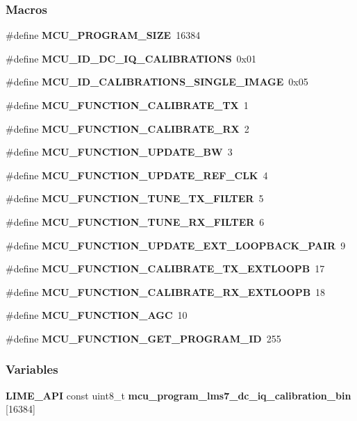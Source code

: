 \subsubsection*{Macros}
\begin{DoxyCompactItemize}
\item 
\#define {\bf M\+C\+U\+\_\+\+P\+R\+O\+G\+R\+A\+M\+\_\+\+S\+I\+ZE}~16384
\item 
\#define {\bf M\+C\+U\+\_\+\+I\+D\+\_\+\+D\+C\+\_\+\+I\+Q\+\_\+\+C\+A\+L\+I\+B\+R\+A\+T\+I\+O\+NS}~0x01
\item 
\#define {\bf M\+C\+U\+\_\+\+I\+D\+\_\+\+C\+A\+L\+I\+B\+R\+A\+T\+I\+O\+N\+S\+\_\+\+S\+I\+N\+G\+L\+E\+\_\+\+I\+M\+A\+GE}~0x05
\item 
\#define {\bf M\+C\+U\+\_\+\+F\+U\+N\+C\+T\+I\+O\+N\+\_\+\+C\+A\+L\+I\+B\+R\+A\+T\+E\+\_\+\+TX}~1
\item 
\#define {\bf M\+C\+U\+\_\+\+F\+U\+N\+C\+T\+I\+O\+N\+\_\+\+C\+A\+L\+I\+B\+R\+A\+T\+E\+\_\+\+RX}~2
\item 
\#define {\bf M\+C\+U\+\_\+\+F\+U\+N\+C\+T\+I\+O\+N\+\_\+\+U\+P\+D\+A\+T\+E\+\_\+\+BW}~3
\item 
\#define {\bf M\+C\+U\+\_\+\+F\+U\+N\+C\+T\+I\+O\+N\+\_\+\+U\+P\+D\+A\+T\+E\+\_\+\+R\+E\+F\+\_\+\+C\+LK}~4
\item 
\#define {\bf M\+C\+U\+\_\+\+F\+U\+N\+C\+T\+I\+O\+N\+\_\+\+T\+U\+N\+E\+\_\+\+T\+X\+\_\+\+F\+I\+L\+T\+ER}~5
\item 
\#define {\bf M\+C\+U\+\_\+\+F\+U\+N\+C\+T\+I\+O\+N\+\_\+\+T\+U\+N\+E\+\_\+\+R\+X\+\_\+\+F\+I\+L\+T\+ER}~6
\item 
\#define {\bf M\+C\+U\+\_\+\+F\+U\+N\+C\+T\+I\+O\+N\+\_\+\+U\+P\+D\+A\+T\+E\+\_\+\+E\+X\+T\+\_\+\+L\+O\+O\+P\+B\+A\+C\+K\+\_\+\+P\+A\+IR}~9
\item 
\#define {\bf M\+C\+U\+\_\+\+F\+U\+N\+C\+T\+I\+O\+N\+\_\+\+C\+A\+L\+I\+B\+R\+A\+T\+E\+\_\+\+T\+X\+\_\+\+E\+X\+T\+L\+O\+O\+PB}~17
\item 
\#define {\bf M\+C\+U\+\_\+\+F\+U\+N\+C\+T\+I\+O\+N\+\_\+\+C\+A\+L\+I\+B\+R\+A\+T\+E\+\_\+\+R\+X\+\_\+\+E\+X\+T\+L\+O\+O\+PB}~18
\item 
\#define {\bf M\+C\+U\+\_\+\+F\+U\+N\+C\+T\+I\+O\+N\+\_\+\+A\+GC}~10
\item 
\#define {\bf M\+C\+U\+\_\+\+F\+U\+N\+C\+T\+I\+O\+N\+\_\+\+G\+E\+T\+\_\+\+P\+R\+O\+G\+R\+A\+M\+\_\+\+ID}~255
\end{DoxyCompactItemize}
\subsubsection*{Variables}
\begin{DoxyCompactItemize}
\item 
{\bf L\+I\+M\+E\+\_\+\+A\+PI} const uint8\+\_\+t {\bf mcu\+\_\+program\+\_\+lms7\+\_\+dc\+\_\+iq\+\_\+calibration\+\_\+bin} [16384]
\end{DoxyCompactItemize}



